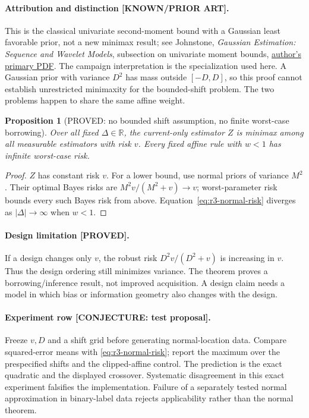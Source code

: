 \documentclass[11pt]{article}
\newtheorem{proposition}[theorem]{Proposition}
\theoremstyle{definition}
\theoremstyle{remark}
\begin{document}
\paragraph{Attribution and distinction [KNOWN/PRIOR ART].}
This is the classical univariate second-moment bound with a Gaussian
least favorable prior, not a new minimax result; see Johnstone,
\emph{Gaussian Estimation: Sequence and Wavelet Models}, subsection on
univariate moment bounds,
\href{https://imjohnstone.su.domains/GE_08_09_17.pdf}{author's primary PDF}.
The campaign interpretation is the specialization used here.
A Gaussian prior with variance $D^2$ has mass outside $[-D,D]$, so this
proof cannot establish unrestricted minimaxity for the bounded-shift
problem.  The two problems happen to share the same affine weight.

\begin{proposition}[PROVED: no bounded shift assumption, no finite worst-case borrowing]
Over all fixed $\Delta\in\mathbb R$, the current-only estimator $Z$ is
minimax among all measurable estimators with risk $v$.  Every fixed
affine rule with $w<1$ has infinite worst-case risk.
\end{proposition}
\begin{proof}
$Z$ has constant risk $v$.  For a lower bound, use normal priors of
variance $M^2$.  Their optimal Bayes risks are $M^2v/(M^2+v)\to v$;
worst-parameter risk bounds every such Bayes risk from above.
Equation~\eqref{eq:r3-normal-risk} diverges as $|\Delta|\to\infty$ when
$w<1$.
\end{proof}

\paragraph{Design limitation [PROVED].}
If a design changes only $v$, the robust risk $D^2v/(D^2+v)$ is increasing
in $v$.  Thus the design ordering still minimizes variance.  The theorem
proves a borrowing/inference result, not improved acquisition.  A design
claim needs a model in which bias or information geometry also changes
with the design.

\paragraph{Experiment row [CONJECTURE: test proposal].}
Freeze $v,D$ and a shift grid before generating normal-location data.
Compare squared-error means with \eqref{eq:r3-normal-risk}; report the
maximum over the prespecified shifts and the clipped-affine control.
The prediction is the exact quadratic and the displayed crossover.
Systematic disagreement in this exact experiment falsifies the
implementation.  Failure of a separately tested normal approximation in
binary-label data rejects applicability rather than the normal theorem.
\end{document}
